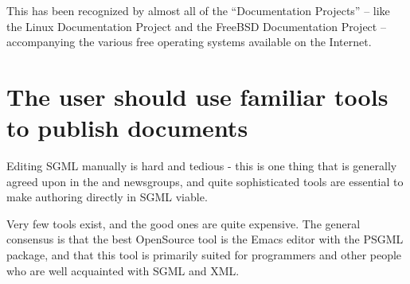 
This has been recognized by almost all of the ``Documentation
Projects'' -- like the Linux
  Documentation Project and the FreeBSD
  Documentation Project -- accompanying the various free operating
systems available on the Internet.








\section{The user should use familiar tools to publish documents}
\label{sec:the-user-should-use-familiar-tools-to-publish-documents}

Editing SGML manually is hard and tedious - this is one
thing that is generally agreed upon in the
 and
newsgroups, and quite sophisticated tools are essential to
make authoring directly in SGML viable.

Very few tools exist, and the good ones are quite expensive.  The
general consensus is that the best OpenSource tool is the Emacs editor
with the PSGML package, and that
this tool is primarily suited for programmers and other people who are
well acquainted with SGML and XML.

